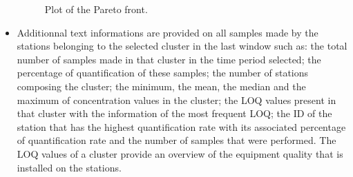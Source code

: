 \begin{itemize}
\begin{figure}[htbp]
 \caption{Plot of the Pareto front.}
 \label{fig:Imapp8}
\end{figure}
\item Additionnal text informations are provided on all samples made by the stations belonging to the selected cluster in the last window such as: the total number of samples made in that cluster in the time period selected; the percentage of quantification of these samples; the number of stations composing the cluster; the minimum, the mean, the median and the maximum of concentration values in the cluster; the LOQ values present in that cluster with the information of the most frequent LOQ; the ID of the station that has the highest quantification rate with its associated percentage of quantification rate and the number of samples that were performed. The LOQ values of a cluster provide an overview of the equipment quality that is installed on the stations.    
\end{itemize}
